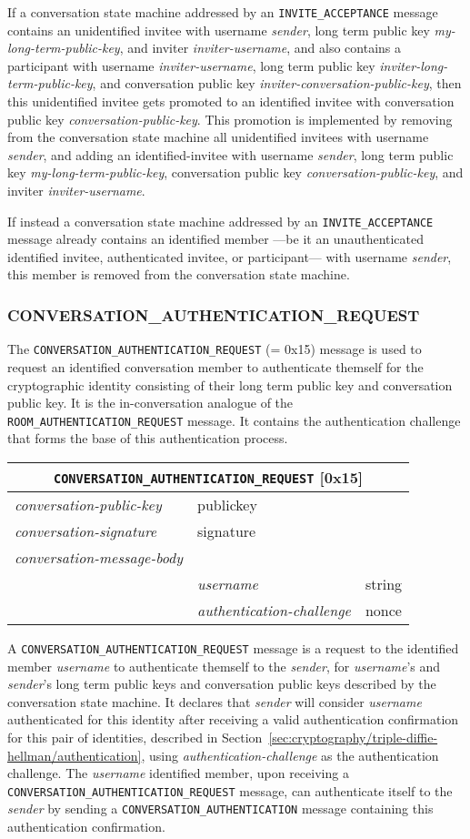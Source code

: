 \documentclass{article}
\def\npmessage#1{\texttt{#1}}
\def\field#1{\textit{#1}}
\def\type#1{\textsf{#1}}
\newenvironment{conversationmessage}[2]{
\newcommand{\messagefield}[2]{
& \field{##1} & \type{##2} \\
\hline
}
\hspace{2em minus 2em}\begin{tabular}{|l|l|l|}
\hline
\multicolumn{3}{|c|}{\npmessage{#1} [#2]} \\
\hline
\hline
\field{conversation-public-key} & \multicolumn{2}{l|}{\type{publickey}} \\
\hline
\field{conversation-signature} & \multicolumn{2}{l|}{\type{signature}} \\
\hline
\field{conversation-message-body} & \multicolumn{2}{l|}{} \\
\hline
}{
\end{tabular}
}
\begin{document}
If a conversation state machine addressed by an \npmessage{INVITE\_ACCEPTANCE} message contains an unidentified invitee with username \field{sender}, long term public key \field{my-long-term-public-key}, and inviter \field{inviter-username}, and also contains a participant with username \field{inviter-username}, long term public key \field{inviter-long-term-public-key}, and conversation public key \field{inviter-conversation-public-key}, then this unidentified invitee gets promoted to an identified invitee with conversation public key \field{conversation-public-key}.
This promotion is implemented by removing from the conversation state machine all unidentified invitees with username \field{sender}, and adding an \type{identified-invitee} with username \field{sender}, long term public key \field{my-long-term-public-key}, conversation public key \field{conversation-public-key}, and inviter \field{inviter-username}.

If instead a conversation state machine addressed by an \npmessage{INVITE\_ACCEPTANCE} message already contains an identified member ---be it an unauthenticated identified invitee, authenticated invitee, or participant--- with username \field{sender}, this member is removed from the conversation state machine.


\subsubsection{CONVERSATION\_AUTHENTICATION\_REQUEST}
\label{sec:messages/conversation-authentication-request}

The \npmessage{CONVERSATION\_AUTHENTICATION\_REQUEST} (= 0x15) message is used to request an identified conversation member to authenticate themself for the cryptographic identity consisting of their long term public key and conversation public key.
It is the in-conversation analogue of the \npmessage{ROOM\_AUTHENTICATION\_REQUEST} message.
It contains the authentication challenge that forms the base of this authentication process.

\begin{conversationmessage}{CONVERSATION\_AUTHENTICATION\_REQUEST}{0x15}
\messagefield{username}{string}
\messagefield{authentication-challenge}{nonce}
\end{conversationmessage}

A \npmessage{CONVERSATION\_AUTHENTICATION\_REQUEST} message is a request to the identified member \field{username} to authenticate themself to the \field{sender}, for \field{username}'s and \field{sender}'s long term public keys and conversation public keys described by the conversation state machine.
It declares that \field{sender} will consider \field{username} authenticated for this identity after receiving a valid authentication confirmation for this pair of identities, described in Section~\ref{sec:cryptography/triple-diffie-hellman/authentication}, using \field{authentication-challenge} as the authentication challenge.
The \field{username} identified member, upon receiving a \npmessage{CONVERSATION\_AUTHENTICATION\_REQUEST} message, can authenticate itself to the \field{sender} by sending a \npmessage{CONVERSATION\_AUTHENTICATION} message containing this authentication confirmation.
\end{document}
